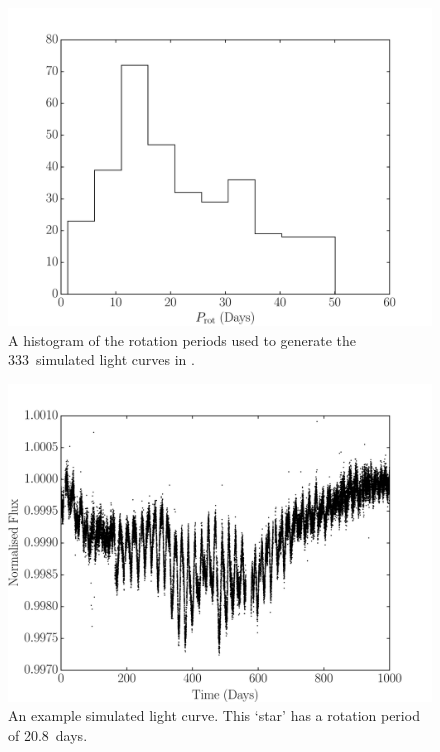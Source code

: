 \documentclass[useAMS, usenatbib, preprint, 12pt]{aastex}
\newcommand{\naigrain}{333}
\newcommand{\aigrainexampleperiod}{20.8}
\begin{document}
\begin{figure}
\begin{center}
\includegraphics[width=6in, clip=true]{figures/period_hist.pdf}
\caption{A histogram of the rotation periods used to generate the \naigrain\
simulated light curves in \citet{Aigrain2015}.}
\label{fig:period_hist}
\end{center}
\end{figure}

\begin{figure}
\begin{center}
\includegraphics[width=6in, clip=true]{figures/demo_lc.pdf}
\caption[A simulated light curve.]
{An example simulated light curve. This `star' has a rotation period of
\aigrainexampleperiod\ days.}
\label{fig:demo_lc}
\end{center}
\end{figure}
\end{document}

